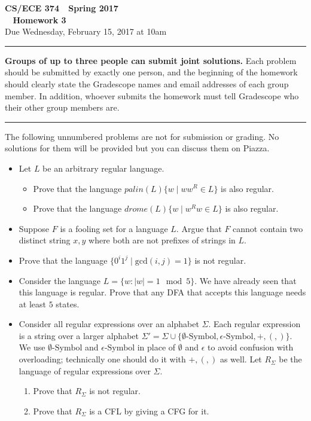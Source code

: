 \documentclass[11pt]{article}
\begin{document}

\thispagestyle{empty}

\begin{center}
\Large\textbf{CS/ECE 374 \,\decosix\,  Spring 2017}%
\\
\LARGE\textbf{\decothreeleft~ Homework 3 ~\decothreeright}%
\\[0.5ex]
\large Due Wednesday, February 15, 2017 at 10am
\end{center}

\bigskip
\hrule
\bigskip

\noindent
\textbf{Groups of up to three people can submit joint solutions.}  Each problem should be submitted by exactly one person, and the beginning of the homework should clearly state the Gradescope names and email addresses of each group member.  In addition, whoever submits the homework must tell Gradescope who their other group members are.
\bigskip
\hrule
\bigskip


\noindent
The following unnumbered problems are not for submission or grading. 
No solutions for them will be provided but you can discuss them on Piazza.
\begin{itemize}
\item Let $L$ be an arbitrary regular language.
  \begin{itemize}
  \item Prove that the language $palin(L) \{w \mid ww^R \in L\}$ is
    also regular. 
  \item  Prove that the language $drome(L) \{w \mid w^Rw \in
    L\}$ is also regular.
  \end{itemize}

\item Suppose $F$ is a fooling set for a language $L$. Argue that
$F$ cannot contain two distinct string $x,y$ where both
are not prefixes of strings in $L$.

\item Prove that the language $\{0^i1^j \mid \text{gcd}(i,j) = 1\}$ is 
  not regular.
\item Consider the language $L = \{w : |w| = 1 \mod 5\}$. We have already
  seen that this language is regular. Prove that any DFA that accepts this
  language needs at least $5$ states.

\item Consider all regular expressions over an alphabet $\Sigma$. Each
  regular expression is a string over a larger alphabet $\Sigma' =
  \Sigma \cup \{
  \emptyset\text{-Symbol},\epsilon\text{-Symbol},+,(,)\}$.  We use
  $\emptyset\text{-Symbol}$ and $\epsilon\text{-Symbol}$ in place of
  $\emptyset$ and $\epsilon$ to avoid confusion with overloading; technically
  one should do it with $+,(,)$ as well.  Let $R_\Sigma$ be
  the language of regular expressions over $\Sigma$.
  \begin{enumerate}
  \item Prove that $R_\Sigma$ is not regular.
  \item Prove that $R_\Sigma$ is a CFL by giving a CFG for it.
  \end{enumerate}

\end{itemize}
\end{document}
